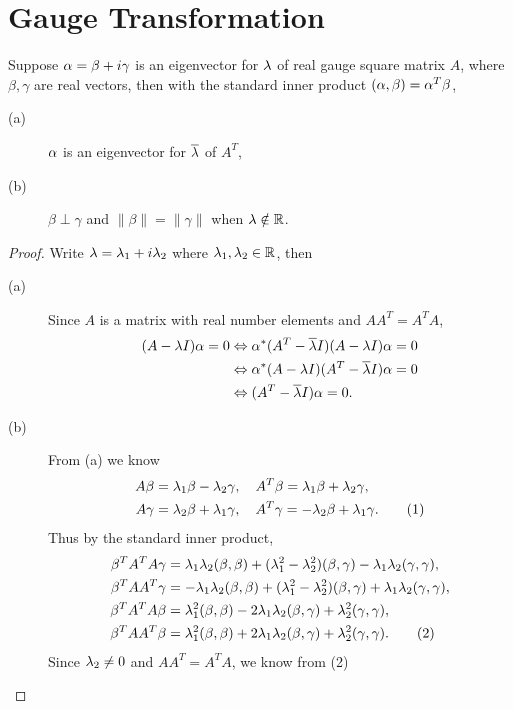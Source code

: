 \section{Gauge Transformation}
\begin{pro}%
	Suppose $\alpha=\beta+i\gamma$ is an eigenvector for $\lambda$ of real gauge square matrix $A$, where $\beta,\gamma$ are real vectors, then with the standard inner product $(\alpha,\beta)=\alpha^T\beta$,
	\begin{description}
	\item[(a)] $\alpha$ is an eigenvector for $\overline{\lambda}$ of $A^T$,
	\item[(b)] $\beta\perp\gamma$ and $\|\beta\|=\|\gamma\|$ when $\lambda\notin \mathbb{R}$.
	\end{description}
\end{pro}
\begin{proof}
	Write $\lambda=\lambda_1+i\lambda_2$ where $\lambda_1,\lambda_2\in\mathbb{R}$, then
	\begin{description}
	\item[(a)] Since $A$ is a matrix with real number elements and $AA^T=A^TA$, 
	\begin{align*}
		(A-\lambda I)\alpha=0&\Leftrightarrow \alpha^*(A^T-\overline{\lambda}I)(A-\lambda I)\alpha=0\\
		&\Leftrightarrow\alpha^*(A-\lambda I)(A^T-\overline{\lambda}I)\alpha=0\\
		&\Leftrightarrow (A^T-\overline{\lambda}I)\alpha=0.
	\end{align*}
	\item[(b)] From (a) we know
	\begin{align*}
		A\beta&=\lambda_1\beta-\lambda_2\gamma,\quad A^T\beta=\lambda_1\beta+\lambda_2\gamma,\\
		A\gamma&=\lambda_2\beta+\lambda_1\gamma,\quad A^T\gamma=-\lambda_2\beta+\lambda_1\gamma.\tag{1}
	\end{align*}
	Thus by the standard inner product,
	\begin{align*}
		\beta^TA^TA\gamma&=\lambda_1\lambda_2(\beta,\beta)+(\lambda_1^2-\lambda_2^2)(\beta,\gamma)-\lambda_1\lambda_2(\gamma,\gamma),\\
		\beta^TAA^T\gamma&=-\lambda_1\lambda_2(\beta,\beta)+(\lambda_1^2-\lambda_2^2)(\beta,\gamma)+\lambda_1\lambda_2(\gamma,\gamma),\\
		\beta^TA^TA\beta&=\lambda_1^2(\beta,\beta)-2\lambda_1\lambda_2(\beta,\gamma)+\lambda_2^2(\gamma,\gamma),\\
		\beta^TAA^T\beta&=\lambda_1^2(\beta,\beta)+2\lambda_1\lambda_2(\beta,\gamma)+\lambda_2^2(\gamma,\gamma).\tag{2}
	\end{align*}
	Since $\lambda_2\neq 0$ and $AA^T=A^TA$, we know from (2)

\end{description}
\end{proof}
